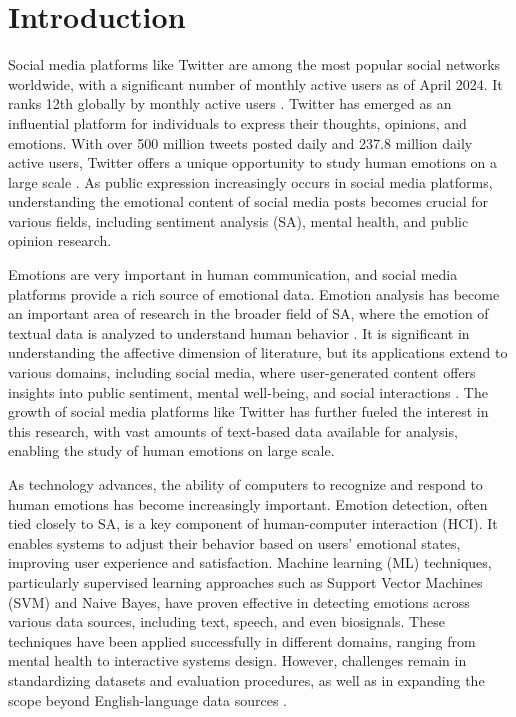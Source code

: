 

\section{Introduction}

Social media platforms like Twitter are among the most popular social networks worldwide, with a significant number of monthly active users as of April 2024. It ranks 12th globally by monthly active users \cite{statistica2023}. Twitter has emerged as an influential platform for individuals to express their thoughts, opinions, and emotions. With over 500 million tweets posted daily and 237.8 million daily active users, Twitter offers a unique opportunity to study human emotions on a large scale \cite{internetlivestats2023}\cite{twitterstats2023}. As public expression increasingly occurs in social media platforms, understanding the emotional content of social media posts becomes crucial for various fields, including sentiment analysis (SA), mental health, and public opinion research.

Emotions are very important in human communication, and social media platforms provide a rich source of emotional data. Emotion analysis has become an important area of research in the broader field of SA, where the emotion of textual data is analyzed to understand human behavior \cite{Kim2019}. It is significant in understanding the affective dimension of literature, but its applications extend to various domains, including social media, where user-generated content offers insights into public sentiment, mental well-being, and social interactions \cite{Hakak2017}. The growth of social media platforms like Twitter has further fueled the interest in this research, with vast amounts of text-based data available for analysis, enabling the study of human emotions on large scale.

As technology advances, the ability of computers to recognize and respond to human emotions has become increasingly important. Emotion detection, often tied closely to SA, is a key component of human-computer interaction (HCI). It enables systems to adjust their behavior based on users' emotional states, improving user experience and satisfaction. Machine learning (ML) techniques, particularly supervised learning approaches such as Support Vector Machines (SVM) and Naive Bayes, have proven effective in detecting emotions across various data sources, including text, speech, and even biosignals. These techniques have been applied successfully in different domains, ranging from mental health to interactive systems design. However, challenges remain in standardizing datasets and evaluation procedures, as well as in expanding the scope beyond English-language data sources \cite{Alslaity2022}.
